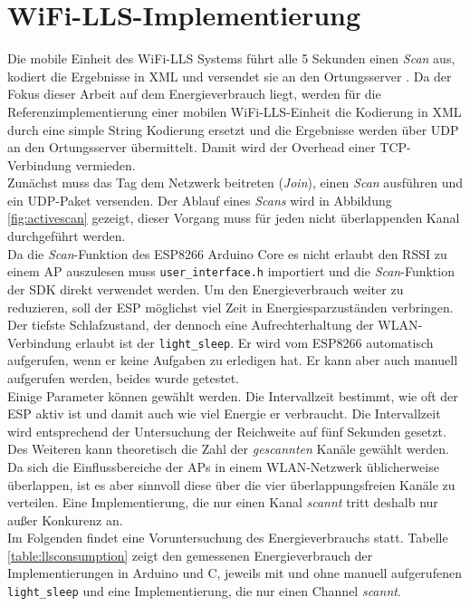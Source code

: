 \section{WiFi-LLS-Implementierung}
\label{ch:phase1:sec:wifills}
Die mobile Einheit des WiFi-LLS Systems führt alle 5 Sekunden einen \emph{Scan} aus, kodiert die Ergebnisse in XML und versendet sie an den Ortungsserver \cite{chen2007design}.
Da der Fokus dieser Arbeit auf dem Energieverbrauch liegt, werden für die Referenzimplementierung einer mobilen WiFi-LLS-Einheit die Kodierung in XML durch eine simple String Kodierung ersetzt und die Ergebnisse werden über UDP an den Ortungsserver übermittelt. 
Damit wird der Overhead einer TCP-Verbindung vermieden.\\
Zunächst muss das Tag dem Netzwerk beitreten (\emph{Join}), einen \emph{Scan} ausführen und ein UDP-Paket versenden.
Der Ablauf eines \emph{Scans} wird in Abbildung \ref{fig:activescan} gezeigt, dieser Vorgang muss für jeden nicht überlappenden Kanal durchgeführt werden.\\
Da die \emph{Scan}-Funktion des ESP8266 Arduino Core es nicht erlaubt den RSSI zu einem AP auszulesen muss \texttt{user\_interface.h} importiert und die \emph{Scan}-Funktion der SDK direkt verwendet werden.
Um den Energieverbrauch weiter zu reduzieren, soll der ESP möglichst viel Zeit in Energiesparzuständen verbringen.
Der tiefste Schlafzustand, der dennoch eine Aufrechterhaltung der WLAN-Verbindung erlaubt ist der \texttt{light\_sleep}. 
Er wird vom ESP8266 automatisch aufgerufen, wenn er keine Aufgaben zu erledigen hat.
Er kann aber auch manuell aufgerufen werden, beides wurde getestet.\\
Einige Parameter können gewählt werden. 
Die Intervallzeit bestimmt, wie oft der ESP aktiv ist und damit auch wie viel Energie er verbraucht.
Die Intervallzeit wird entsprechend der Untersuchung der Reichweite auf fünf Sekunden gesetzt.
Des Weiteren kann theoretisch die Zahl der \emph{gescannten} Kanäle gewählt werden. 
Da sich die Einflussbereiche der APs in einem WLAN-Netzwerk üblicherweise überlappen, ist es aber sinnvoll diese über die vier überlappungsfreien Kanäle zu verteilen. 
Eine Implementierung, die nur einen Kanal \emph{scannt} tritt deshalb nur außer Konkurenz an.\\
Im Folgenden findet eine Voruntersuchung des Energieverbrauchs statt.
Tabelle \ref{table:llsconsumption} zeigt den gemessenen Energieverbrauch der Implementierungen in Arduino und C, jeweils mit und ohne manuell aufgerufenen \texttt{light\_sleep} und eine Implementierung, die nur einen Channel \emph{scannt}.
